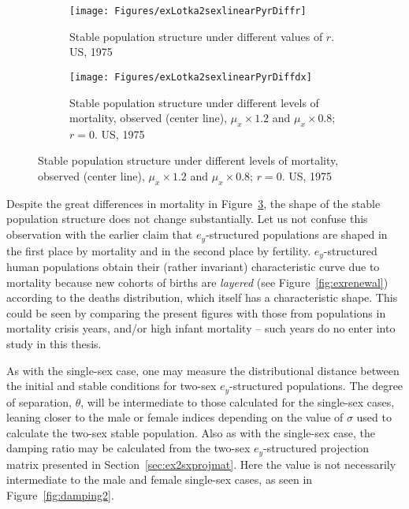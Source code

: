 \begin{figure}[!ht]
        \centering
        \begin{subfigure}
            \centering
            \caption{Stable population structure under
          different values of $r$. US, 1975 }
        	\label{fig:cystabler}
                \texttt{[image: Figures/exLotka2sexlinearPyrDiffr]}
        \end{subfigure}
        \begin{subfigure}
            \centering
            \caption{Stable population structure under
          different levels of mortality, observed (center line), $\mu_x \times
          1.2$ and $\mu_x \times 0.8$; $r=0$. US, 1975}
            \label{fig:cystabledx}
                \texttt{[image: Figures/exLotka2sexlinearPyrDiffdx]}
        \end{subfigure}
\end{figure}
\FloatBarrier
Despite the great differences in mortality in Figure~\ref{fig:cystabledx}, the
shape of the stable population structure does not change substantially. Let us
not confuse this observation with the earlier claim that $e_y$-structured
populations are shaped in the first place by mortality and in the second place
by fertility. $e_y$-structured human populations obtain their
(rather invariant) characteristic curve due to mortality because new cohorts of
births are \textit{layered} (see Figure~\ref{fig:exrenewal}) according to the
deaths distribution, which itself has a characteristic shape. This could be seen
by comparing the present figures with those from populations in mortality crisis
years, and/or high infant mortality -- such years do no enter into study in this
thesis.

As with the single-sex case, one may measure the distributional distance between
the initial and stable conditions for two-sex $e_y$-structured populations. The
degree of separation, $\theta$, will be intermediate to those calculated for the 
single-sex cases, leaning closer to the male or
female indices depending on the value of $\sigma$ used to calculate the two-sex
stable population. Also as with the single-sex case, the damping
ratio may be calculated from the two-sex $e_y$-structured projection matrix 
presented in Section~\ref{sec:ex2sxprojmat}. Here the value is not
necessarily intermediate to the male and female single-sex cases, as seen in
Figure~\ref{fig:damping2}.

